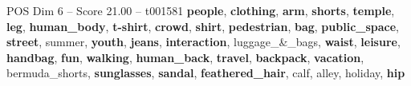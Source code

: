 \begin{textsample}{POS Dim 6 – Score 21.00 – t001581}  \label{ex:f6_pos_003}
\textbf{people}, \textbf{clothing}, \textbf{arm}, \textbf{shorts}, \textbf{temple}, \textbf{leg}, \textbf{human\_body}, \textbf{t-shirt}, \textbf{crowd}, \textbf{shirt}, \textbf{pedestrian}, \textbf{bag}, \textbf{public\_space}, \textbf{street}, summer, \textbf{youth}, \textbf{jeans}, \textbf{interaction}, luggage\_\&\_bags, \textbf{waist}, \textbf{leisure}, \textbf{handbag}, \textbf{fun}, \textbf{walking}, \textbf{human\_back}, \textbf{travel}, \textbf{backpack}, \textbf{vacation}, bermuda\_shorts, \textbf{sunglasses}, \textbf{sandal}, \textbf{feathered\_hair}, calf, alley, holiday, \textbf{hip}

\end{textsample}
